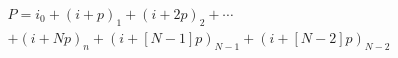 \documentclass[preview]{standalone}
\begin{document}
\begin{align*}
P = i_0+(i+p)_1+(i+2p)_2+\cdots\\+(i+Np)_n+(i+[N-1]p)_{N-1}+(i+[N-2]p)_{N-2}
\end{align*}
\end{document}
